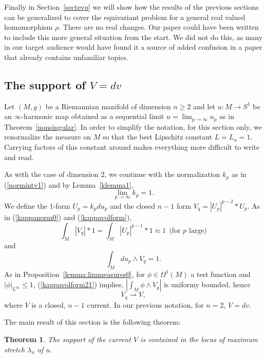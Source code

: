 \documentclass{ip-journal}
\newtheorem{theorem}{Theorem}[section]
\theoremstyle{definition}
\numberwithin{equation}{section}
\begin{document}
Finally in Section~\ref{sectevp} we will show how the results of the previous sections can be generalized to cover the equivariant problem for a general real valued homomorphism $\rho$.  There are no real changes. Our paper could have been written to include this more general situation from the start.  We did not do this, as many in our target audience would have found it a source of added confusion in a paper that already contains unfamiliar topics.

\subsection{The support of $V=dv$} Let  $(M,g)$ be a Riemannian manifold  of dimension $n \geq 2$ and 
let $u: M \rightarrow S^1$ be an $\infty$-harmonic map obtained as a sequential limit $u=\lim_{p \rightarrow \infty}u_p$ as in Theorem~\ref{nonsingular}. In order to simplify the notation, for this section only, we  renormalize the measure on $M$ so that the best Lipschitz constant $L=L_u= 1$.  Carrying factors of this constant around makes everything more difficult to write and read.

 As with the case of dimension 2, we continue  with the normalization $k_p$ as in  (\ref{normintv1}) 
 and by Lemma~\ref{klemma1}, 
\begin{equation}\label{klemma11}
\lim_{p \rightarrow \infty} k_p = 1.
\end{equation}
We define the 1-form $ U_p = k_p d  u_p$ and the closed $n-1$ form $V_q = |  U_p|^{p-2}*  U_p$. As in  (\ref{kappanorm0}) and (\ref{kappavolform}),
\begin{equation} \label{kappavolform21}
\int_M |V_q|*1=\int_M |  U_p|^{p-1}*1
 \approx 1 \ \ \mbox{(for $p$ large)}
\end{equation}
and
\begin{equation} \label{kappavolform22}
\int_M d  u_p \wedge V_q=1.
\end{equation}
As in Proposition~\ref{lemma:limmeasures0},
for $\phi \in  \Omega^1(M)$ a test function and $|\phi|_{L^\infty} \leq 1$,  (\ref{kappavolform21}) implies,
  $\left | \int_M \phi \wedge V_q  \right | $ is uniformy bounded,  
  hence 
  \[
  V_q \rightharpoonup  V, 
  \]
  where $V$ is a closed, $n-1$ current. In our previous notation, for $n=2$, $V=dv$.

The main result of this section is the following theorem:
\begin{theorem}\label{thm:supptmeasure} The support of the current $V$  is contained in the locus of maximum stretch $ \lambda_u$ of $u$.
\end{theorem}
\end{document}
